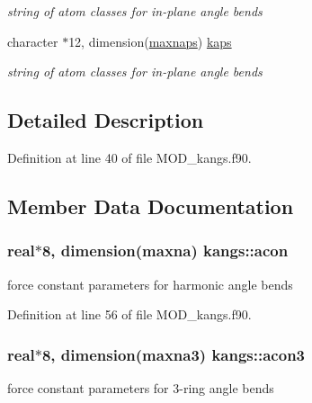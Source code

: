 \begin{DoxyCompactItemize}
\begin{DoxyCompactList}\small\item\em string of atom classes for in-\/plane angle bends \end{DoxyCompactList}\item 
character $\ast$12, dimension(\hyperlink{classkangs_a6646c9ed34bc273addaebe53e7ece288}{maxnaps}) \hyperlink{classkangs_a38e37031d21fcaad9c9d41214393bb4b}{kaps}
\begin{DoxyCompactList}\small\item\em string of atom classes for in-\/plane angle bends \end{DoxyCompactList}\end{DoxyCompactItemize}


\subsection{Detailed Description}


Definition at line 40 of file M\-O\-D\-\_\-kangs.\-f90.



\subsection{Member Data Documentation}
\hypertarget{classkangs_a2fb695824cd8ddcc728928f17bd3a849}{
\subsubsection[{acon}]{\setlength{\rightskip}{0pt plus 5cm}real$\ast$8, dimension({\bf maxna}) kangs\-::acon}}\label{classkangs_a2fb695824cd8ddcc728928f17bd3a849}


force constant parameters for harmonic angle bends 



Definition at line 56 of file M\-O\-D\-\_\-kangs.\-f90.

\hypertarget{classkangs_a8da9a28628dad91da237adc26d9241f6}{
\subsubsection[{acon3}]{\setlength{\rightskip}{0pt plus 5cm}real$\ast$8, dimension({\bf maxna3}) kangs\-::acon3}}\label{classkangs_a8da9a28628dad91da237adc26d9241f6}


force constant parameters for 3-\/ring angle bends 



